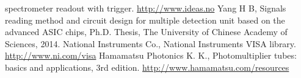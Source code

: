 \documentclass{nst}
\providecommand{\DIFadd}[1]{{\protect\color{yellow} \sf #1}} %
\providecommand{\DIFaddbegin}{} %
\providecommand{\DIFaddend}{} %
\providecommand{\DIFdelbegin}{} %
\providecommand{\DIFdelend}{} %
\begin{document}
\begin{thebibliography}{99}
\DIFdelend \DIFaddbegin \DIFadd{spectrometer readout with trigger. }\href{http://www.ideas.no/products/ide3160-2/}{http://www.ideas.no}
	\DIFaddend {} Yang \DIFdelbegin \DIFdelend \DIFaddbegin \DIFadd{H B, Signals reading method and circuit design for multiple detection unit based on the advanced }\DIFaddend {ASIC} \DIFdelbegin \DIFdelend \DIFaddbegin \DIFadd{chips, }\DIFaddend Ph.D. Thesis, The University of Chinese Academy of Sciences, 2014.
	\DIFaddbegin {} \DIFadd{National Instruments Co.,  National Instruments }{\DIFadd{VISA}} \DIFadd{library. }\href{http://www.ni.com/visa/}{http://www.ni.com/visa}
	\DIFaddend {} Hamamatsu Photonics K. K., Photomultiplier tubes: basics and applications, 3rd \DIFdelbegin %
\DIFdelend \DIFaddbegin \DIFadd{edition.
	}\href{http://www.hamamatsu.com/resources/pdf/etd/PMT_handbook_v3aE.pdf}{http://www.hamamatsu.com/resources}
\DIFaddend \end{thebibliography}


%
\end{document}
